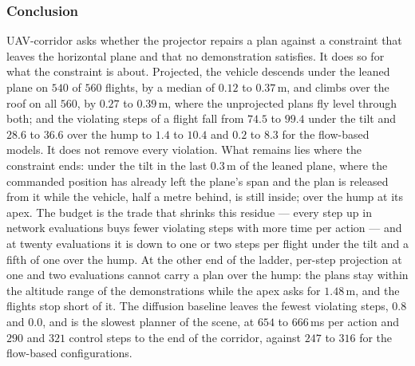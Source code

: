 
\subsubsection{Conclusion}\label{sec:res:uav:corridor:conclusion}

UAV-corridor asks whether the projector repairs a plan against a constraint that leaves the horizontal plane
and that no demonstration satisfies. It does so for what the constraint is about. Projected, the vehicle
descends under the leaned plane on $540$ of $560$ flights, by a median of $0.12$ to $0.37$\,m, and climbs
over the roof on all $560$, by $0.27$ to $0.39$\,m, where the unprojected plans fly level through both; and
the violating steps of a flight fall from $74.5$ to $99.4$ under the tilt and $28.6$ to $36.6$ over the hump
to $1.4$ to $10.4$ and $0.2$ to $8.3$ for the flow-based models. It does not remove every violation. What
remains lies where the constraint ends: under the tilt in the last $0.3$\,m of the leaned plane, where the
commanded position has already left the plane's span and the plan is released from it while the vehicle,
half a metre behind, is still inside; over the hump at its apex. The budget is the trade that shrinks this
residue --- every step up in network evaluations buys fewer violating steps with more time per action --- and
at twenty evaluations it is down to one or two steps per flight under the tilt and a fifth of one over the
hump. At the other end of the ladder, per-step projection at one and two evaluations cannot carry a plan over
the hump: the plans stay within the altitude range of the demonstrations while the apex asks for $1.48$\,m,
and the flights stop short of it. The diffusion baseline leaves the fewest violating steps, $0.8$ and $0.0$,
and is the slowest planner of the scene, at $654$ to $666$\,ms per action and $290$ and $321$ control steps to
the end of the corridor, against $247$ to $316$ for the flow-based configurations.

